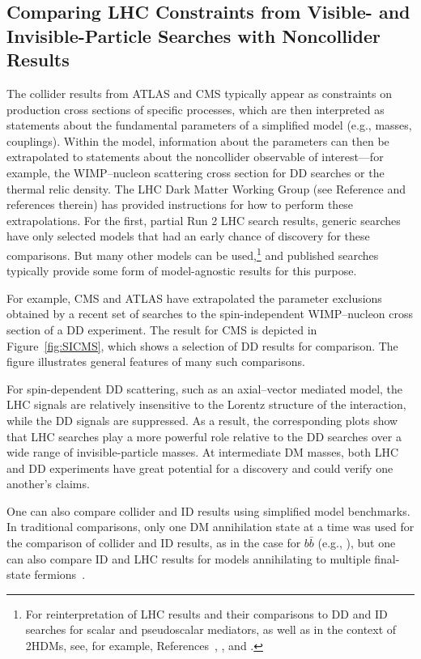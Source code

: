 \documentclass{ar-1col}
\begin{document}
{\subsection{Comparing LHC Constraints from Visible- and Invisible-Particle Searches with Noncollider Results}

The collider results from ATLAS and CMS typically appear as constraints
on production cross sections of specific processes, which are then
interpreted as statements about the fundamental parameters of a
simplified model (e.g., masses, couplings). Within the model,
information about the parameters can then be extrapolated to
statements about the noncollider observable of interest---for
example, the WIMP--nucleon scattering cross section for DD searches or the
thermal relic density. The LHC Dark
Matter Working Group (see Reference  and references therein) has provided instructions for how to
perform these extrapolations. For the first, partial Run 2 LHC search results, 
generic searches have only selected models that had an early chance of discovery 
for these comparisons. But many other
models can be used,\footnote{For reinterpretation of LHC results
and their comparisons to DD and ID searches for scalar and pseudoscalar
mediators, as well as in the context of 2HDMs, see, for example, References~, , and .} and
published searches typically provide some form of model-agnostic
results for this purpose.

For example, CMS and ATLAS have extrapolated the parameter exclusions
obtained by a recent set of searches to the spin-independent
WIMP--nucleon cross section of a DD experiment. The
result for CMS is depicted in Figure~\ref{fig:SICMS}, which shows a selection of DD results
for comparison. The figure illustrates general features of
many such comparisons. 

For spin-dependent DD scattering, such as an axial--vector mediated model, 
the LHC signals are relatively insensitive to the Lorentz structure of the 
interaction, while the DD signals are suppressed. 
As a result, the corresponding plots show that LHC searches play a more
powerful role relative to the DD searches over a wide range of invisible-particle masses. 
At intermediate DM masses,
both LHC and DD experiments have great potential for a discovery
and could verify one another's claims. 

One can also compare collider and ID results using
simplified model benchmarks. In traditional comparisons, only one
DM annihilation state at a time was used for the comparison
of collider and ID results, as in the case for $b\bar{b}$ (e.g., ), but one can also compare ID and
LHC results for models annihilating to multiple final-state
fermions~\cite{Carpenter:2016thc}.

}
\end{document}
